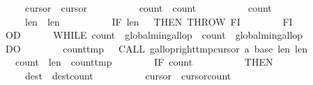\begin{isabellebody}
\ \ \ \ \ \ \ \ \ \ {\isasymacute}cursor{}\ {\isacharcolon}{\isacharequal}{\isacharequal}\ {\isasymacute}cursor{}{\isacharminus}{}{\isacharsemicolon}{\isacharsemicolon}\isanewline
\ \ \ \ \ \ \ \ \ \ {\isasymacute}count{}\ {\isacharcolon}{\isacharequal}{\isacharequal}\ {\isasymacute}count{}{\isacharplus}{}{\isacharsemicolon}{\isacharsemicolon}\isanewline
\ \ \ \ \ \ \ \ \ \ {\isasymacute}count{}\ {\isacharcolon}{\isacharequal}{\isacharequal}\ {}{\isacharsemicolon}{\isacharsemicolon}\isanewline
\ \ \ \ \ \ \ \ \ \ {\isasymacute}len{}\ {\isacharcolon}{\isacharequal}{\isacharequal}\ {\isasymacute}len{}{\isacharminus}{}{\isacharsemicolon}{\isacharsemicolon}\isanewline
\ \ \ \ \ \ \ \ \ \ IF\ {\isasymacute}len{}\ {\isacharequal}\ {}\ THEN\ THROW\ FI\isanewline
\ \ \ \ \ \ \ \ FI\isanewline
\ \ \ \ \ \ OD{\isacharsemicolon}{\isacharsemicolon}\isanewline
\ \ \ \ \ \ WHILE\ {\isacharparenleft}{\isasymacute}count{}\ {\isasymge}\ {\isasymacute}global{\isacharunderscore}min{\isacharunderscore}gallop\ {\isacharbar}\ {\isasymacute}count{}\ {\isasymge}\ {\isasymacute}global{\isacharunderscore}min{\isacharunderscore}gallop{\isacharparenright}\isanewline
\ \ \ \ \ \ DO\isanewline
\ \ \ \ \ \ \ \ {\isasymacute}count{\isacharunderscore}tmp\ {\isacharcolon}{\isacharequal}{\isacharequal}\ \ CALL\ gallop{\isacharunderscore}right{\isacharparenleft}{\isasymacute}tmp{\isacharbang}{\isasymacute}cursor{}{\isacharcomma}\ {\isasymacute}a{\isacharcomma}\ {\isasymacute}base{}{\isacharcomma}\ {\isasymacute}len{}{\isacharcomma}\ {\isasymacute}len{}{\isacharminus}{}{\isacharparenright}{\isacharsemicolon}{\isacharsemicolon}\isanewline
\ \ \ \ \ \ \ \ {\isasymacute}count{}\ {\isacharcolon}{\isacharequal}{\isacharequal}\ {\isasymacute}len{}\ {\isacharminus}\ {\isasymacute}count{\isacharunderscore}tmp{\isacharsemicolon}{\isacharsemicolon}\isanewline
\ \ \ \ \ \ \ \ IF\ {\isasymacute}count{}\ {\isasymnoteq}\ {}\isanewline
\ \ \ \ \ \ \ \ THEN\isanewline
\ \ \ \ \ \ \ \ \ \ {\isasymacute}dest\ {\isacharcolon}{\isacharequal}{\isacharequal}\ {\isasymacute}dest{\isacharminus}{\isasymacute}count{}{\isacharsemicolon}{\isacharsemicolon}\isanewline
\ \ \ \ \ \ \ \ \ \ {\isasymacute}cursor{}\ {\isacharcolon}{\isacharequal}{\isacharequal}\ {\isasymacute}cursor{}{\isacharminus}{\isasymacute}count{}{\isacharsemicolon}{\isacharsemicolon}\isanewline

\end{isabellebody}
